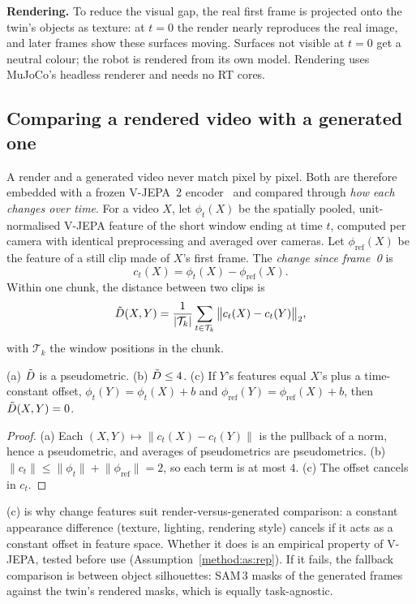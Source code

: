 \textbf{Rendering.} To reduce the visual gap, the real first frame is projected onto the twin's objects as texture: at $t=0$ the render nearly reproduces the real image, and later frames show these surfaces moving. Surfaces not visible at $t=0$ get a neutral colour; the robot is rendered from its own model. Rendering uses MuJoCo's headless renderer and needs no RT cores.

\subsection{Comparing a rendered video with a generated one}\label{method:sec:compare}
A render and a generated video never match pixel by pixel. Both are therefore embedded with a frozen V-JEPA~2 encoder~\cite{vjepa2} and compared through \emph{how each changes over time}. For a video $X$, let $\phi_t(X)$ be the spatially pooled, unit-normalised V-JEPA feature of the short window ending at time $t$, computed per camera with identical preprocessing and averaged over cameras. Let $\phi_{\mathrm{ref}}(X)$ be the feature of a still clip made of $X$'s first frame. The \emph{change since frame~0} is
\begin{equation}\label{method:eq:change}
c_t(X)=\phi_t(X)-\phi_{\mathrm{ref}}(X).
\end{equation}
Within one chunk, the distance between two clips is
\begin{equation}\label{method:eq:dt}
\tilde D(X,Y)=\frac{1}{|\mathcal T_k|}\sum_{t\in\mathcal T_k}\big\lVert c_t(X)-c_t(Y)\big\rVert_2,
\end{equation}
with $\mathcal T_k$ the window positions in the chunk.

\begin{proposition}[Properties of $\Dt$]\label{method:prop:dt}
(a) $\Dt$ is a pseudometric. (b) $\tilde D\le4$. (c) If $Y$'s features equal $X$'s plus a time-constant offset, $\phi_t(Y)=\phi_t(X)+b$ and $\phi_{\mathrm{ref}}(Y)=\phi_{\mathrm{ref}}(X)+b$, then $\tilde D(X,Y)=0$.
\end{proposition}
\begin{proof}
(a) Each $(X,Y)\mapsto\lVert c_t(X)-c_t(Y)\rVert$ is the pullback of a norm, hence a pseudometric, and averages of pseudometrics are pseudometrics. (b) $\lVert c_t\rVert\le\lVert\phi_t\rVert+\lVert\phi_{\mathrm{ref}}\rVert=2$, so each term is at most $4$. (c) The offset cancels in $c_t$.
\end{proof}
\begin{remark}
(c) is why change features suit render-versus-generated comparison: a constant appearance difference (texture, lighting, rendering style) cancels if it acts as a constant offset in feature space. Whether it does is an empirical property of V-JEPA, tested before use (Assumption~\ref{method:as:rep}). If it fails, the fallback comparison is between object silhouettes: SAM\,3 masks of the generated frames against the twin's rendered masks, which is equally task-agnostic.
\end{remark}

